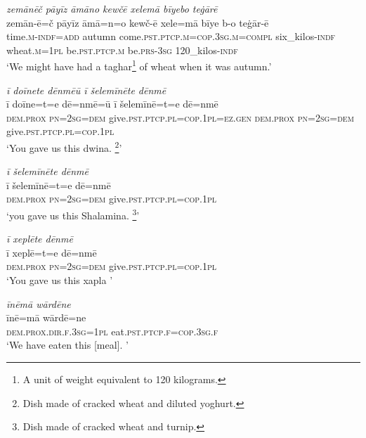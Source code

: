 \ea \label{RE.70}
\textit{zemānēč pāyīz āmāno kewčē xelemā bīyebo teġārē} \\ 
\gll zemān-ē=č pāyīz āmā=n=o kewč-ē xele=mā bīye b-o teġār-ē \\ 
 time\textsc{.m}\textsc{-indf}\textsc{=add} autumn come\textsc{.pst}\textsc{.ptcp}\textsc{.m}\textsc{=cop}\textsc{.3sg}\textsc{.m}\textsc{=compl} six\_kilos\textsc{-indf} wheat\textsc{.m}\textsc{=\textsc{1pl}} be\textsc{.pst}\textsc{.ptcp}\textsc{.m} be\textsc{.prs}\textsc{-3sg} 120\_kilos\textsc{-indf} \\ 
\glt `We might have had a taghar\footnote{A unit of weight equivalent to 120 kilograms.} of wheat when it was autumn.'
\z 
 
\ea \label{ŽE.50}
\textit{ī doīnete dēnmēū ī šelemīnēte dēnmē} \\ 
\gll ī doīne=t=e dē=nmē=ū ī šelemīnē=t=e dē=nmē \\ 
 \textsc{dem.prox} \textsc{pn}\textsc{=\textsc{2sg}}\textsc{=dem} give\textsc{.pst}\textsc{.ptcp}\textsc{.pl}\textsc{=cop}\textsc{.1pl}\textsc{\textsc{=ez.gen}} \textsc{dem.prox} \textsc{pn}\textsc{=\textsc{2sg}}\textsc{=dem} give\textsc{.pst}\textsc{.ptcp}\textsc{.pl}\textsc{=cop}\textsc{.1pl} \\ 
\glt `You gave us this dwina. \footnote{Dish made of cracked wheat and diluted yoghurt.}'
\z 
 
\ea \label{ŽE.51}
\textit{ī šelemīnēte dēnmē} \\ 
\gll ī šelemīnē=t=e dē=nmē \\ 
 \textsc{dem.prox} \textsc{pn}\textsc{=\textsc{2sg}}\textsc{=dem} give\textsc{.pst}\textsc{.ptcp}\textsc{.pl}\textsc{=cop}\textsc{.1pl} \\ 
\glt `you gave us this Shalamina. \footnote{Dish made of cracked wheat and turnip.}'
\z 
 
\ea \label{ŽE.52}
\textit{ī xeplēte dēnmē} \\ 
\gll ī xeplē=t=e dē=nmē \\ 
 \textsc{dem.prox} \textsc{pn}\textsc{=\textsc{2sg}}\textsc{=dem} give\textsc{.pst}\textsc{.ptcp}\textsc{.pl}\textsc{=cop}\textsc{.1pl} \\ 
\glt `You gave us this xapla '
\z 
 
\ea \label{ŽE.53}
\textit{īnēmā wārdēne} \\ 
\gll īnē=mā wārdē=ne \\ 
 \textsc{dem.prox}\textsc{.dir}\textsc{.f}\textsc{.3sg}\textsc{=1pl} eat\textsc{.pst}\textsc{.ptcp}\textsc{.f}\textsc{=cop}\textsc{.3sg}\textsc{.f} \\ 
\glt `We have eaten this [meal]. '
\z 
 
